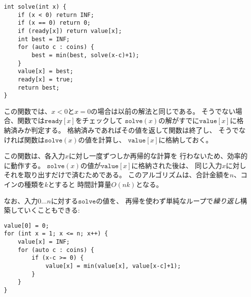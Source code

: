 \begin{lstlisting}
int solve(int x) {
    if (x < 0) return INF;
    if (x == 0) return 0;
    if (ready[x]) return value[x];
    int best = INF;
    for (auto c : coins) {
        best = min(best, solve(x-c)+1);
    }
    value[x] = best;
    ready[x] = true;
    return best;
}
\end{lstlisting}

\begin{comment}
The function handles the base cases
$x<0$ and $x=0$ as previously.
Then the function checks from
$\texttt{ready}[x]$ if
$\texttt{solve}(x)$ has already been stored
in $\texttt{value}[x]$,
and if it is, the function directly returns it.
Otherwise the function calculates the value
of $\texttt{solve}(x)$
recursively and stores it in $\texttt{value}[x]$.

This function works efficiently,
because the answer for each parameter $x$
is calculated recursively only once.
After a value of $\texttt{solve}(x)$ has been stored in $\texttt{value}[x]$,
it can be efficiently retrieved whenever the
function will be called again with the parameter $x$.
The time complexity of the algorithm is $O(nk)$,
where $n$ is the target sum and $k$ is the number of coins.
\end{comment}

この関数では、$x<0$と$x=0$の場合は以前の解法と同じである。
そうでない場合、関数では$\texttt{ready}[x]$をチェックして
$\texttt{solve}(x)$の解がすでに$\texttt{value}[x]$に格納済みか判定する。
格納済みであればその値を返して関数は終了し、
そうでなければ関数は$\texttt{solve}(x)$の値を計算し、
$\texttt{value}[x]$に格納しておく。

この関数は、各入力$x$に対し一度ずつしか再帰的な計算を
行わないため、効率的に動作する。
$\texttt{solve}(x)$の値が$\texttt{value}[x]$に格納された後は、
同じ入力$x$に対しそれを取り出すだけで済むためである。
このアルゴリズムは、合計金額を$n$、コインの種類を$k$とすると
時間計算量$O(nk)$となる。

\begin{comment}
Note that we can also 
construct the array \texttt{value} using
a loop that simply calculates all the values
of $\texttt{solve}$ for parameters $0 \ldots n$:
\end{comment}

なお、入力$0 \ldots n$に対する$\texttt{solve}$の値を、
再帰を使わず単純なループで\emph{繰り返し}構築していくこともできる:

\begin{lstlisting}
value[0] = 0;
for (int x = 1; x <= n; x++) {
    value[x] = INF;
    for (auto c : coins) {
        if (x-c >= 0) {
            value[x] = min(value[x], value[x-c]+1);
        }
    }
}
\end{lstlisting}

